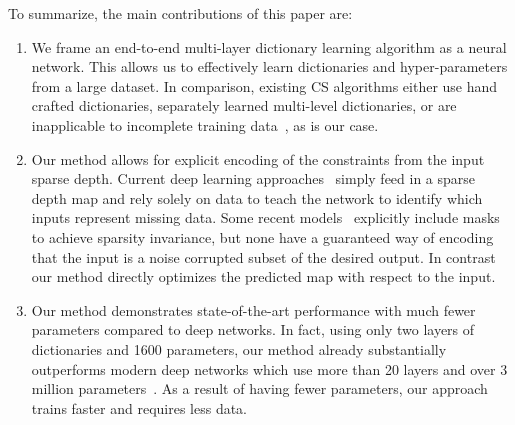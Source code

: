To summarize, the main contributions of this paper are:
\begin{enumerate}
\item We frame an end-to-end multi-layer dictionary learning algorithm as a neural network. This allows us to effectively learn dictionaries and hyper-parameters from a large dataset. In comparison, existing CS algorithms either use hand crafted dictionaries, separately learned multi-level dictionaries, or are inapplicable to incomplete training data~\cite{sulam}, as is our case.

  
\item Our method allows for explicit encoding of the constraints from the input sparse depth. Current deep learning approaches~\cite{sparsetodense} simply feed in a sparse depth map and rely solely on data to teach the network to identify which inputs represent missing data. Some recent models~\cite{uhrig} explicitly include masks to achieve sparsity invariance, but none have a guaranteed way of encoding that the input is a noise corrupted subset of the desired output. In contrast our method directly optimizes the predicted map with respect to the input.
  
  
\item Our method demonstrates state-of-the-art performance with much fewer parameters compared to deep networks. In fact, using only two layers of dictionaries and 1600 parameters, our method already substantially outperforms modern deep networks which use more than 20 layers and over 3 million parameters~\cite{sparsetodense}. As a result of having fewer parameters, our approach trains faster and requires less data.
  
\end{enumerate}
  